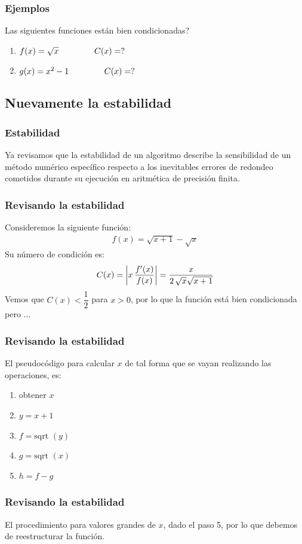 \documentclass[12pt]{beamer}
\begin{document}
\begin{frame}
\frametitle{Ejemplos}
Las siguientes funciones están bien condicionadas?
\pause
{}
\begin{enumerate}[<+->]
\item $f (x) = \sqrt{x} \hspace{1.5cm} C (x) = ?$
\item $g (x) = x^{2}-1 \hspace{1.5cm} C (x) = ?$
\end{enumerate}
\end{frame}

\subsection{Nuevamente la estabilidad}

\begin{frame}
\frametitle{Estabilidad}
Ya revisamos que la estabilidad de un algoritmo describe la sensibilidad de un método numérico específico
respecto a los inevitables errores de redondeo cometidos durante su ejecución en aritmética de precisión finita.
\end{frame}
\begin{frame}
\frametitle{Revisando la estabilidad}
Consideremos la siguiente función:
\begin{align*}
f (x) = \sqrt{x + 1} - \sqrt{x}
\end{align*}
\pause
Su número de condición es:
\pause
\begin{align*}
C (x) = \abs{ x \, \dfrac{{f}^{\prime} (x)}{f(x)} } = \dfrac{x}{2 \, \sqrt{x} \sqrt{x+1}}
\end{align*}
\pause
Vemos que $C (x) < \dfrac{1}{2}$ para $x > 0$, por lo que la función está bien condicionada pero ...
\end{frame}
\begin{frame}
\frametitle{Revisando la estabilidad}
El pseudocódigo para calcular $x$ de tal forma que se vayan realizando las operaciones, es:
\pause
{}
\begin{enumerate}[<+->]
\item obtener $x$
\item $y = x + 1$
\item $f = \text{sqrt } (y)$
\item $g = \text{sqrt } (x)$
\item $h = f - g$
\end{enumerate}
\end{frame}
\begin{frame}
\frametitle{Revisando la estabilidad}	
El procedimiento  para valores grandes de $x$, dado el paso 5, por lo que debemos de reestructurar la función.
\end{frame}
\end{document}
